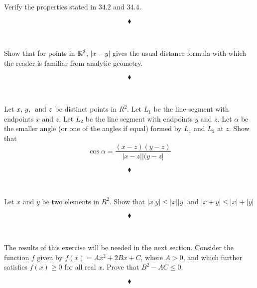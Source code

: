 \subsection{}
\begin{tcolorbox}
Verify the properties stated in $\mathbf{34.2}$ and $\mathbf{34.4}$.
\end{tcolorbox}

$$\blacklozenge$$\\


\subsection{}
\begin{tcolorbox}
Show that for points in $\mathbb{R}^2$, $|x-y|$ gives the usual distance formula with which the reader is familiar from analytic geometry.
\end{tcolorbox}

$$\blacklozenge$$\\
\subsection{}
\begin{tcolorbox}
Let $x,\, y,\, \text{ and } z$ be distinct points in $R^2$. Let $L_1$ be the line segment with endpoints $x$ and $z$. Let $L_2$ be the line segment with endpoints $y$ and $z$. Let $\alpha$ be the smaller angle (or one of the angles if equal) formed by $L_1$ and $L_2$ at $z$. Show that $$\cos\alpha = \frac{(x-z)(y-z)}{|x-z| |(y-z|}$$
\end{tcolorbox}

$$\blacklozenge$$\\

\subsection{}
\begin{tcolorbox}
Let $x$ and $y$ be two elements in $R^2$. Show that $|x. y|\leq |x||y|$ and $|x+y|\leq |x|+|y|$
\end{tcolorbox}

$$\blacklozenge$$\\
\subsection{}
\begin{tcolorbox}
The results of this exercise will be needed in the next section. Consider the function $f$ given by $f (x) = A x^2+ 2Bx+ C$, where $A>0$, and which further satisfies $f(x) \geq 0$ for all real $x$. Prove that $B^2-AC\leq 0$. 
\end{tcolorbox}

$$\blacklozenge$$
\newpage